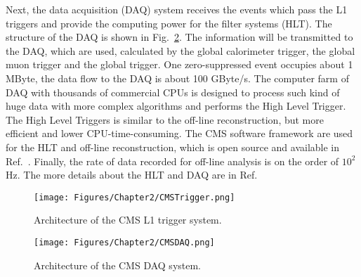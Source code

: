 Next, the data acquisition (DAQ) system receives the events which pass the L1 triggers and provide the computing power for the filter systems (HLT).
The structure of the DAQ is shown in Fig.~\ref{fig:CMSDAQ}.
The information will be transmitted to the DAQ, which are used, calculated by the global calorimeter trigger, the global muon trigger and the global trigger.
One zero-suppressed event occupies about 1 MByte, the data flow to the DAQ is about 100 GByte/s.
The computer farm of DAQ with thousands of commercial CPUs is designed to process such kind of huge data with more complex algorithms and performs the High Level Trigger.
The High Level Triggers is similar to the off-line reconstruction, but more efficient and lower CPU-time-consuming. 
The CMS software framework are used for the HLT and off-line reconstruction, which is open source and available in Ref.~\cite{CMSSW}.
Finally, the rate of data recorded for off-line analysis is on the order of $10^{2}$ Hz.
The more details about the HLT and DAQ are in Ref.~\cite{Cittolin:578006}

\begin{figure}[t]
  \centering
  \texttt{[image: Figures/Chapter2/CMSTrigger.png]}
  \caption{Architecture of the CMS L1 trigger system.}
  \label{fig:CMSTrigger}
\end{figure}

\begin{figure}[t]
  \centering
  \texttt{[image: Figures/Chapter2/CMSDAQ.png]}
  \caption{Architecture of the CMS DAQ system.}
  \label{fig:CMSDAQ}
\end{figure}
